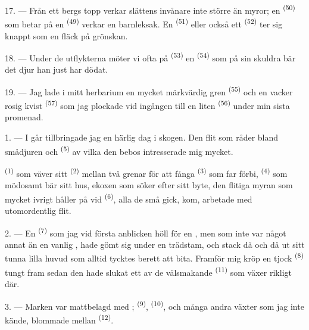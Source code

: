 17. --- Från ett bergs topp verkar slättens invånare inte större än myror; en
 \textsuperscript{(50)} som betar på en 
\textsuperscript{(49)} verkar en barnleksak. En  \textsuperscript{(51)} eller
också ett  \textsuperscript{(52)} ter sig knappt som en fläck på
grönskan.

18. --- Under de utflykterna möter vi ofta på  \textsuperscript{(53)} en
 \textsuperscript{(54)} som på sin skuldra bär det djur han just har dödat.

19. --- Jag lade i mitt herbarium en mycket märkvärdig gren 
\textsuperscript{(55)} och en vacker rosig kvist  \textsuperscript{(57)} som jag
plockade vid ingången till en liten
 \textsuperscript{(56)} under min sista promenad.

\VUsaut{3.0mm}
\VUsaut{3.0mm}

\VUsaut{3.0mm}

1. --- I går tillbringade jag en härlig dag i skogen. Den flit som råder bland smådjuren och
 \textsuperscript{(5)} av vilka den bebos intresserade mig mycket.

 \textsuperscript{(1)} som väver sitt 
\textsuperscript{(2)} mellan två grenar för att fånga  \textsuperscript{(3)}
som far förbi,  \textsuperscript{(4)} som mödosamt bär sitt hus, ekoxen som
söker efter sitt byte, den flitiga myran som mycket ivrigt håller på vid 
\textsuperscript{(6)}, alla de små gick, kom, arbetade med utomordentlig flit.

2. --- En  \textsuperscript{(7)} som jag vid första anblicken höll för en
, men som inte var något annat än en vanlig
, hade gömt sig under en trädstam, och stack då och då ut sitt tunna
lilla huvud som alltid tycktes berett att bita. Framför mig kröp en tjock
 \textsuperscript{(8)} tungt fram sedan den hade slukat ett av de
välsmakande  \textsuperscript{(11)} som växer rikligt där.

3. --- Marken var mattbelagd med ; 
\textsuperscript{(9)},  \textsuperscript{(10)}, och många andra växter som
jag inte kände, blommade mellan  \textsuperscript{(12)}.

